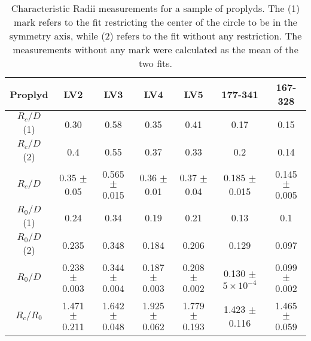  \begin{table*}
\begin{tabular}{c|cccccc}\hline
Proplyd & LV2 & LV3 & LV4  & LV5 & 177-341 & 167-328 \\\hline
$R_c/D$ (1) & 0.30 & 0.58  & 0.35 & 0.41 & 0.17 & 0.15 \\
$R_c/D$ (2) & 0.4 & 0.55 & 0.37 & 0.33 & 0.2 & 0.14    \\
$R_c/D$     & 0.35 $\pm$ 0.05 & 0.565 $\pm$ 0.015 & 0.36  $\pm$ 0.01  & 0.37 $\pm$ 0.04 & 0.185 $\pm$ 0.015 & 0.145 $\pm$ 0.005 \\
$R_0/D$ (1) & 0.24 & 0.34 & 0.19 & 0.21 & 0.13 & 0.1 \\
$R_0/D$ (2) & 0.235 & 0.348  & 0.184 & 0.206 & 0.129 & 0.097 \\
$R_0/D$     & 0.238 $\pm$ 0.003 & 0.344 $\pm$ 0.004 & 0.187 $\pm$ 0.003 & 0.208 $\pm$ 0.002 & 0.130 $\pm$ $5\times 10^{-4}$ & 0.099 $\pm$ 0.002 \\
$R_c/R_0$ & 1.471 $\pm$ 0.211 & 1.642 $\pm$ 0.048 & 1.925 $\pm$ 0.062 & 1.779 $\pm$ 0.193 & 1.423 $\pm$ 0.116 & 1.465 $\pm$ 0.059 
\end{tabular}
\caption{Characteristic Radii measurements for a sample of proplyds. The (1) mark refers to the fit restricting
the center of the circle to be in the symmetry axis, while (2) refers to the fit without any restriction. The
measurements without any mark were calculated as the mean of the two fits.}
\label{tab:proplyds}
\end{table*}
